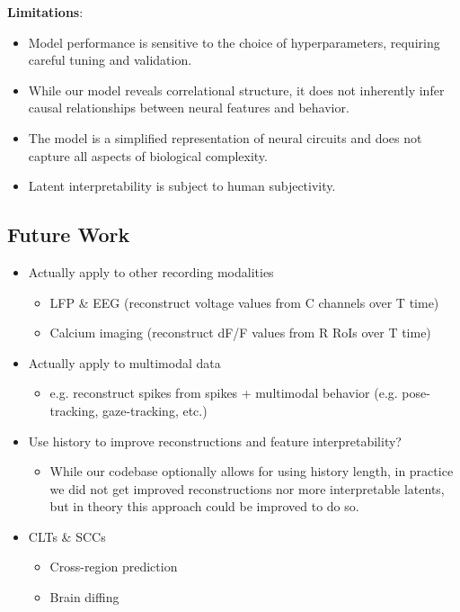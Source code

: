 \textbf{Limitations}:
\begin{itemize}
    \item Model performance is sensitive to the choice of hyperparameters, requiring careful tuning and validation.
    \item  While our model reveals correlational structure, it does not inherently infer causal relationships between neural features and behavior.
    \item The model is a simplified representation of neural circuits and does not capture all aspects of biological complexity.
    \item Latent interpretability is subject to human subjectivity.
\end{itemize}

\subsection{Future Work}

\begin{itemize}
    
    \item Actually apply to other recording modalities
    \begin{itemize}
        \item LFP \& EEG (reconstruct voltage values from C channels over T time)
        \item Calcium imaging (reconstruct dF/F values from R RoIs over T time)
    \end{itemize}
    
    \item Actually apply to multimodal data
    \begin{itemize}
        \item e.g. reconstruct spikes from spikes + multimodal behavior (e.g. pose-tracking, gaze-tracking, etc.)
    \end{itemize}
    
    \item Use history to improve reconstructions and feature interpretability?
    \begin{itemize}
        \item While our codebase optionally allows for using history length, in practice we did not get improved reconstructions nor more interpretable latents, but in theory this approach could be improved to do so.
    \end{itemize}
    
    \item CLTs \& SCCs
    \begin{itemize}
        \item Cross-region prediction
        \item Brain diffing
    \end{itemize}

\end{itemize}
